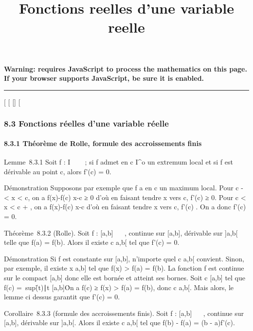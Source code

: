 \documentclass[]{article}
\title{Fonctions reelles d'une variable reelle}
\author{}
\date{}
\begin{document}
\maketitle

\textbf{Warning: 
requires JavaScript to process the mathematics on this page.\\ If your
browser supports JavaScript, be sure it is enabled.}

\begin{center}\rule{3in}{0.4pt}\end{center}

{[}
{[}
{[}{]}
{[}

\subsubsection{8.3 Fonctions réelles d'une variable réelle}

\paragraph{8.3.1 Théorème de Rolle, formule des accroissements finis}

Lemme~8.3.1 Soit f : I \rightarrow~ ~~; si f admet en c \in I^o un
extremum local et si f est dérivable au point c, alors f'(c) = 0.

Démonstration Supposons par exemple que f a en c un maximum local. Pour
c - \eta \textless{} x \textless{} c, on a  f(x)-f(c)
\over x-c ≥ 0 d'où en faisant tendre x vers c, f'(c) ≥
0. Pour c \textless{} x \textless{} c + \eta, on a  f(x)-f(c)
\over x-c  d'où en faisant tendre x vers c, f'(c) . On a donc f'(c) = 0.

Théorème~8.3.2 (Rolle). Soit f : {[}a,b{]} \rightarrow~ ~, continue sur {[}a,b{]},
dérivable sur {]}a,b{[} telle que f(a) = f(b). Alors il existe c
\in{]}a,b{[} tel que f'(c) = 0.

Démonstration Si f est constante sur {[}a,b{]}, n'importe quel c
\in{]}a,b{[} convient. Sinon, par exemple, il existe x \in {[}a,b{]} tel que
f(x) \textgreater{} f(a) = f(b). La fonction f est continue sur le
compact {[}a,b{]} donc elle est bornée et atteint ses bornes. Soit c \in
{[}a,b{]} tel que f(c) =\
sup\f(t)∣t \in
{[}a,b{]}\. On a f(c) ≥ f(x) \textgreater{} f(a) =
f(b), donc c \in{]}a,b{[}. Mais alors, le lemme ci dessus garantit que
f'(c) = 0.

Corollaire~8.3.3 (formule des accroissements finis). Soit f : {[}a,b{]}
\rightarrow~ \mathbb{R}~, continue sur {[}a,b{]}, dérivable sur {]}a,b{[}. Alors il existe c
\in{]}a,b{[} tel que f(b) - f(a) = (b - a)f'(c).
\end{document}
